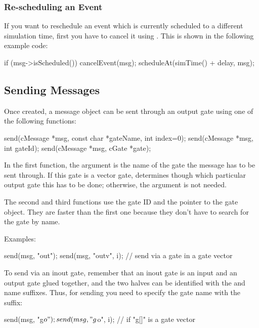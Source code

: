\subsubsection{Re-scheduling an Event}

If you want to reschedule an event which is currently scheduled to a different
simulation time, first you have to cancel it using .
This is shown in the following example code:

\begin{cpp}
if (msg->isScheduled())
    cancelEvent(msg);
scheduleAt(simTime() + delay, msg);
\end{cpp}


\subsection{Sending Messages}

Once created, a message object can be sent through an
output gate using one of the following functions:

\begin{cpp}
send(cMessage *msg, const char *gateName, int index=0);
send(cMessage *msg, int gateId);
send(cMessage *msg, cGate *gate);
\end{cpp}

In the first function, the argument  is the name of
the gate the message has to be sent through. If this gate is
a vector gate,  determines though which particular output
gate this has to be done; otherwise, the  argument is not
needed.

The second and third functions use the gate ID and the pointer to the gate
object. They are faster than the first one because they don't have to
search for the gate by name.

Examples:

\begin{cpp}
send(msg, "out");
send(msg, "outv", i); // send via a gate in a gate vector
\end{cpp}

To send via an inout gate, remember that an inout gate is an input and an
output gate glued together, and the two halves can be identified with the
 and  name suffixes. Thus, for sending you need to specify
the gate name with the  suffix:

\begin{cpp}
send(msg, "g$o");
send(msg, "g$o", i); // if "g[]" is a gate vector
\end{cpp}



